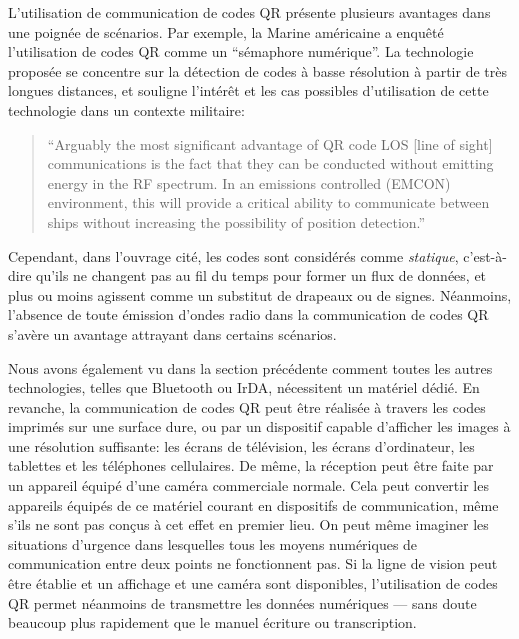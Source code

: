 L'utilisation de communication de codes QR présente plusieurs avantages dans une poignée de scénarios. Par exemple, la Marine américaine a enquêté l'utilisation de codes QR comme un ``sémaphore numérique''. La technologie proposée se concentre sur la détection de codes à basse résolution à partir de très longues distances, et souligne l'intérêt et les cas possibles d'utilisation de cette technologie dans un contexte militaire:

\begin{quote}
``Arguably the most significant advantage of QR code LOS [line of sight] communications is the fact that they can be conducted without emitting energy in the RF spectrum. In an emissions controlled (EMCON) environment, this will provide a critical ability to communicate between ships without increasing the possibility of position detection.'' \citep[p.\ 46]{richter-msc}
\end{quote}

Cependant, dans l'ouvrage cité, les codes sont considérés comme \emph{statique}, c'est-à-dire qu'ils ne changent pas au fil du temps pour former un flux de données, et plus ou moins agissent comme un substitut de drapeaux ou de signes. Néanmoins, l'absence de toute émission d'ondes radio dans la communication de codes QR s'avère un avantage attrayant dans certains scénarios.

Nous avons également vu dans la section précédente comment toutes les autres technologies, telles que Bluetooth ou IrDA, nécessitent un matériel dédié. En revanche, la communication de codes QR peut être réalisée à travers les codes imprimés sur une surface dure, ou par un dispositif capable d'afficher les images à une résolution suffisante: les écrans de télévision, les écrans d'ordinateur, les tablettes et les téléphones cellulaires. De même, la réception peut être faite par un appareil équipé d'une caméra commerciale normale. Cela peut convertir les appareils équipés de ce matériel courant en dispositifs de communication, même s'ils ne sont pas conçus à cet effet en premier lieu. On peut même imaginer les situations d'urgence dans lesquelles tous les moyens numériques de communication entre deux points ne fonctionnent pas. Si la ligne de vision peut être établie et un affichage et une caméra sont disponibles, l'utilisation de codes QR permet néanmoins de transmettre les données numériques --- sans doute beaucoup plus rapidement que le manuel écriture ou transcription.

